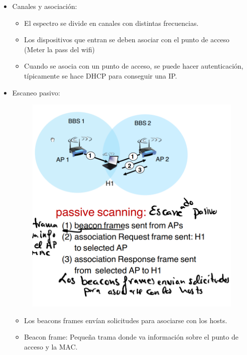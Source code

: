 \documentclass[12pt, twoside, openright]{report} %
\begin{document}
\begin{itemize}
\begin{itemize}
		      \item Canales y asociación:
		            \begin{itemize}
			            \item El espectro se divide en canales con distintas frecuencias.
			            \item Los dispositivos que entran se deben asociar con el punto de acceso (Meter la pass del wifi)
			            \item Cuando se asocia con un punto de acceso, se puede hacer autenticación, típicamente se hace DHCP para conseguir una IP.
		            \end{itemize}
		      \item Escaneo pasivo:
		            \begin{figure}[H]
			            {\includegraphics[scale=.25]{Untitled 61.png}}
		            \end{figure}
		            \begin{itemize}
			            \item Los beacons frames envían solicitudes para asociarse con los hosts.
			            \item Beacon frame: Pequeña trama donde va información sobre el punto de acceso y la MAC.
		            \end{itemize}


\end{itemize}
\end{itemize}
\end{document}
